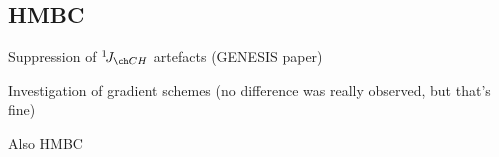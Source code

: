 \subsection{HMBC}
\label{subsec:noah__hmbc}

Suppression of $\oneJ{CH}$ artefacts (GENESIS paper)

Investigation of gradient schemes (no difference was really observed, but that's fine)

Also \nitrogen{} HMBC
